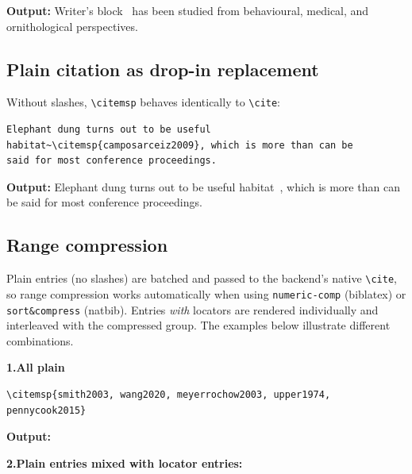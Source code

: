 \documentclass[11pt, a4paper]{article}
\newcommand{\cmd}[1]{\texttt{\textbackslash #1}}
\begin{document}
\noindent\textbf{Output:} Writer's
block~ has been
studied from behavioural, medical, and ornithological perspectives.

\subsection{Plain citation as drop-in replacement}

Without slashes, \cmd{citemsp} behaves identically to \cmd{cite}:

\begin{tcolorbox}[colback=blue!3, colframe=blue!30, boxrule=0.5pt, arc=2pt,
  top=6pt, bottom=6pt, left=10pt, right=10pt]
\begin{verbatim}
Elephant dung turns out to be useful
habitat~\citemsp{camposarceiz2009}, which is more than can be
said for most conference proceedings.
\end{verbatim}
\end{tcolorbox}

\noindent\textbf{Output:} Elephant dung turns out to be useful
habitat~, which is more than can be said for most
conference proceedings.


\subsection{Range compression}

Plain entries (no slashes) are batched and passed to the backend's native
\cmd{cite}, so range compression works automatically when using
\texttt{numeric-comp} (biblatex) or \texttt{sort\&compress} (natbib).
Entries \emph{with} locators are rendered individually and interleaved
with the compressed group.  The examples below illustrate different
combinations.

\medskip
\noindent\textbf{1.\enspace All plain}

\begin{tcolorbox}[colback=blue!3, colframe=blue!30, boxrule=0.5pt, arc=2pt,
  top=6pt, bottom=6pt, left=10pt, right=10pt]
\begin{verbatim}
\citemsp{smith2003, wang2020, meyerrochow2003, upper1974, pennycook2015}
\end{verbatim}
\end{tcolorbox}

\noindent\textbf{Output:}

\medskip
\noindent\textbf{2.\enspace Plain entries mixed with locator entries:}
\end{document}
